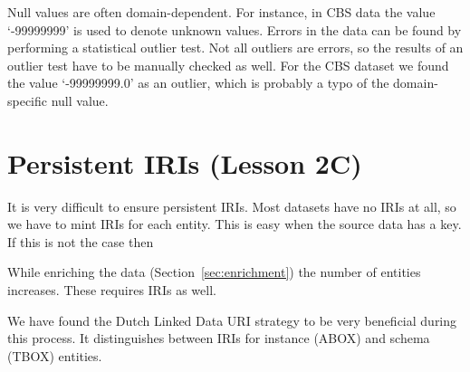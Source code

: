 \documentclass[a4paper]{scrartcl}
\begin{document}
Null values are often domain-dependent.  For instance, in CBS data the
value `-99999999' is used to denote unknown values.  Errors in the
data can be found by performing a statistical outlier test.  Not all
outliers are errors, so the results of an outlier test have to be
manually checked as well.  For the CBS dataset we found the value
`-99999999.0' as an outlier, which is probably a typo of the
domain-specific null value.


\section{Persistent IRIs (Lesson 2C)}
\label{sec:persistent_iris}

It is very difficult to ensure persistent IRIs.  Most datasets have no
IRIs at all, so we have to mint IRIs for each entity.  This is easy
when the source data has a key.  If this is not the case then 

While enriching
the data (Section~\ref{sec:enrichment}) the number of entities
increases.  These requires IRIs as well.

We have found the Dutch Linked Data URI strategy to be very beneficial
during this process.  It distinguishes between IRIs for instance
(ABOX) and schema (TBOX) entities.

\end{document}
